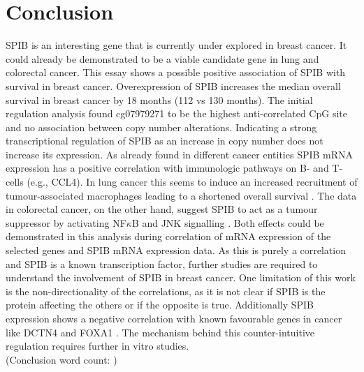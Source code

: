 \section{Conclusion}
\countem

SPIB is an interesting gene that is currently under explored in breast cancer.
It could already be demonstrated to be a viable candidate gene in lung \cite{Huang2021, Zhang2020} and colorectal \cite{Zhao2021} cancer.
This essay shows a possible positive association of SPIB with survival in breast cancer.
Overexpression of SPIB increases the median overall survival in breast cancer by 18 months (112 vs 130 months).
The initial regulation analysis found cg07979271 to be the highest anti-correlated CpG site and no association between copy number alterations.
Indicating a strong transcriptional regulation of SPIB as an increase in copy number does not increase its expression.
As already found in different cancer entities \cite{Huang2021,Zhang2020} SPIB mRNA expression has a positive correlation with immunologic pathways on B- and T-cells (e.g., CCL4).
In lung cancer this seems to induce an increased recruitment of tumour-associated macrophages leading to a shortened overall survival \cite{Huang2021}.
The data in colorectal cancer, on the other hand, suggest SPIB to act as a tumour suppressor by activating NF$\kappa$B and JNK signalling \cite{Zhang2020}.
Both effects could be demonstrated in this analysis during correlation of mRNA expression of the selected genes and SPIB mRNA expression data.
As this is purely a correlation and SPIB is a known transcription factor, further studies are required to understand the involvement of SPIB in breast cancer.
One limitation of this work is the non-directionality of the correlations, as it is not clear if SPIB is the protein affecting the others or if the opposite is true.
Additionally SPIB expression shows a negative correlation with known favourable genes in cancer like DCTN4 \cite{Su2021,Wang2018} and FOXA1 \cite{Wolf2007}.
The mechanism behind this counter-intuitive regulation requires further in vitro studies.
\\
\endcountem 
(Conclusion word count: \thewordcount{})